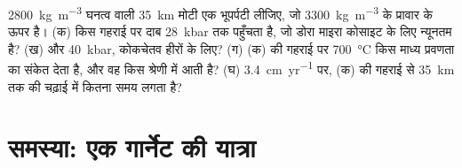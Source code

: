 \begin{exercise}[$\star\star\star$]\label{exo:b2:pt-paths:12}
\qty{2800}{kg.m^{-3}} घनत्व वाली \qty{35}{km} मोटी एक भूपर्पटी लीजिए, जो
\qty{3300}{kg.m^{-3}} के प्रावार के ऊपर है। (क) किस गहराई पर दाब \qty{28}{kbar} तक पहुँचता है, जो
डोरा माइरा कोसाइट के लिए न्यूनतम है? (ख) और \qty{40}{kbar}, कोकचेतव हीरों के लिए?
(ग) (क) की गहराई पर \qty{700}{\celsius} किस माध्य प्रवणता का संकेत देता है, और वह किस
श्रेणी में आती है? (घ) \qty{3.4}{cm.yr^{-1}} पर, (क) की गहराई से
\qty{35}{km} तक की चढ़ाई में कितना समय लगता है?
\end{exercise}

\section{समस्या: एक गार्नेट की यात्रा}

